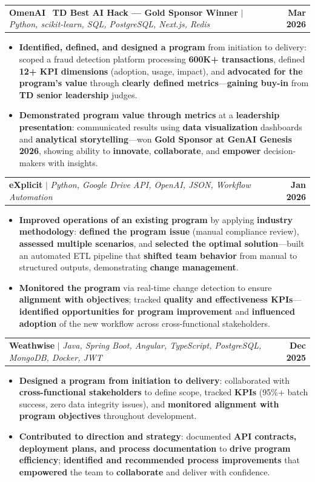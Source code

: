 \documentclass[letterpaper,10pt]{article}
\makeatletter
\newcommand{\resumeItem}[1]{
  \item\small{
    {#1 \vspace{-1pt}}
  }
}
\newcommand{\resumeProjectHeading}[2]{
    \item
    \begin{tabular*}{1.001\textwidth}{l@{\extracolsep{\fill}}r}
      \small#1 & \textbf{\small #2}\\
    \end{tabular*}\vspace{-9pt}
}
\newcommand{\resumeItemListStart}{\begin{itemize}[leftmargin=0.15in]}
\newcommand{\resumeItemListEnd}{\end{itemize}\vspace{-4pt}}
\makeatother
\begin{document}
    \resumeProjectHeading
          {\textbf{OmenAI} \textbar\ \textbf{TD Best AI Hack --- Gold Sponsor Winner} $|$ \emph{Python, scikit-learn, SQL, PostgreSQL, Next.js, Redis}}{Mar 2026}
    \resumeItemListStart
        \resumeItem{\textbf{Identified, defined, and designed a program} from initiation to delivery: scoped a fraud detection platform processing \textbf{600K+ transactions}, defined \textbf{12+ KPI dimensions} (adoption, usage, impact), and \textbf{advocated for the program's value} through \textbf{clearly defined metrics}---\textbf{gaining buy-in} from \textbf{TD senior leadership} judges.}
        \vspace{-2pt}
        \resumeItem{\textbf{Demonstrated program value through metrics} at a \textbf{leadership presentation}: communicated results using \textbf{data visualization} dashboards and \textbf{analytical storytelling}---won \textbf{Gold Sponsor at GenAI Genesis 2026}, showing ability to \textbf{innovate}, \textbf{collaborate}, and \textbf{empower} decision-makers with insights.}
    \resumeItemListEnd
    \vspace{-18pt}

    \resumeProjectHeading
        {\textbf{eXplicit} $|$ \emph{Python, Google Drive API, OpenAI, JSON, Workflow Automation}}{Jan 2026}
        \resumeItemListStart
            \resumeItem{\textbf{Improved operations of an existing program} by applying \textbf{industry methodology}: \textbf{defined the program issue} (manual compliance review), \textbf{assessed multiple scenarios}, and \textbf{selected the optimal solution}---built an automated ETL pipeline that \textbf{shifted team behavior} from manual to structured outputs, demonstrating \textbf{change management}.}
            \vspace{-2pt}
            \resumeItem{\textbf{Monitored the program} via real-time change detection to ensure \textbf{alignment with objectives}; tracked \textbf{quality and effectiveness KPIs}---\textbf{identified opportunities for program improvement} and \textbf{influenced adoption} of the new workflow across cross-functional stakeholders.}
        \resumeItemListEnd
    \vspace{-18pt}

    \resumeProjectHeading
        {\textbf{Weathwise} $|$ \emph{Java, Spring Boot, Angular, TypeScript, PostgreSQL, MongoDB, Docker, JWT}}{Dec 2025}
        \resumeItemListStart
            \resumeItem{\textbf{Designed a program from initiation to delivery}: collaborated with \textbf{cross-functional stakeholders} to define scope, tracked \textbf{KPIs} (95\%+ batch success, zero data integrity issues), and \textbf{monitored alignment with program objectives} throughout development.}
            \vspace{-2pt}
            \resumeItem{\textbf{Contributed to direction and strategy}: documented \textbf{API contracts, deployment plans, and process documentation} to \textbf{drive program efficiency}; \textbf{identified and recommended process improvements} that \textbf{empowered} the team to \textbf{collaborate} and deliver with confidence.}
        \resumeItemListEnd
    \vspace{-8pt}
\end{document}
